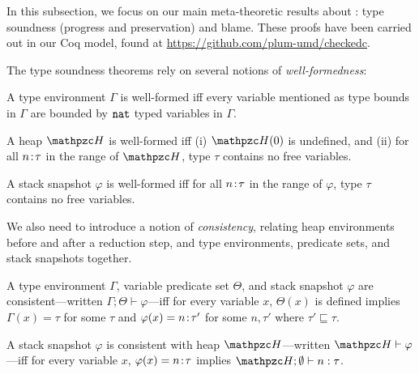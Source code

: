 
In this subsection, we focus on our main meta-theoretic results about
\lang: type soundness (progress and preservation) and
blame.
  These proofs have been carried out in our
  Coq model, found at \url{https://github.com/plum-umd/checkedc}.

The type soundness theorems rely on several notions of
\emph{well-formedness}:

\begin{defi}\label{type-wellformed}
A type environment $\Gamma$ is well-formed iff every variable mentioned as type bounds in $\Gamma$ are bounded by $\texttt{nat}$ typed variables in $\Gamma$.
\end{defi}

\begin{defi}
A heap $\heap$ is well-formed iff (i) $\heap(0)$ is undefined, and
(ii) for all ${n}\!:\!{\tau}$ in the range of $\heap$, type $\tau$
contains no free variables. 
\end{defi}

\begin{defi}
A stack snapshot $\varphi$ is well-formed iff
for all ${n}\!:\!{\tau}$ in the range of $\varphi$, type $\tau$
contains no free variables. 
\end{defi}

We also need to introduce a notion of
\emph{consistency}, relating heap environments before and after a
reduction step, and type environments, predicate sets, and stack
snapshots together.


\begin{defi}
A type environment $\Gamma$, variable predicate set $\Theta$, and
stack snapshot $\varphi$ are consistent---written $\Gamma;\Theta\vdash
\varphi$---iff for every variable $x$, $\Theta(x)$ is defined implies
$\Gamma(x) = \tau$ for some $\tau$ and 
$\varphi(x) ={n}\!:\!{\tau'}$ for some $n,\tau'$ where $\tau' \sqsubseteq \tau$. 
\end{defi}

\begin{defi}
A stack snapshot $\varphi$ is consistent with heap $\heap$---written $\heap \vdash \varphi$---iff
for every variable $x$, $\varphi(x)= {n}\!:\!{\tau}$ implies $\heap;\emptyset \vdash n:\tau$.
\end{defi}

